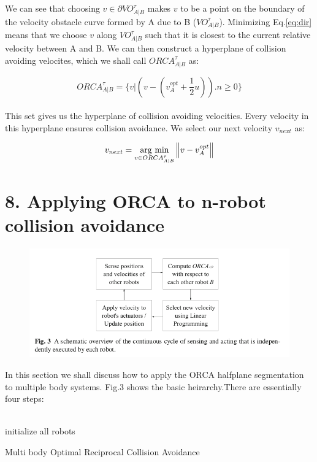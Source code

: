 \documentclass[12pt]{report}
\newcommand{\argmin}[1]{\underset{#1}{\operatorname{arg}\,\operatorname{min}}\;}
\begin{document}
We can see that choosing $v \in \partial VO^{\tau}_{A|B}$ makes $v$ to be a point on the boundary of the velocity obstacle curve formed by A due to B ($VO^{\tau}_{A|B}$). Minimizing Eq.\ref{eq:dir} means that we choose $v$ along $VO^{\tau}_{A|B}$ such that it is closest to the current relative velocity between A and B. We can then construct a hyperplane of collision avoiding velocites, which we shall call $ORCA^{\tau}_{A|B}$ as:

\begin{equation}
ORCA^{\tau}_{A|B} = \{v|(v-(v_{A}^{opt} + \frac{1}{2}u)).n \geq 0\}
\end{equation}\\


This set gives us the hyperplane of collision avoiding velocities. Every velocity in this hyperplane ensures collision avoidance. We select our next velocity $v_{next}$ as:

\begin{equation}
v_{next} = \argmin{v \in ORCA^{\tau}_{A|B}}{\norm {v-v_{A}^{opt}}}
\end{equation}




\chapter*{8.  Applying ORCA to n-robot collision avoidance}
\begin{figure}[h]
	\centering
	\includegraphics[scale=0.6]{n-body.png}  \label{fig:n-body}
\end{figure}
In this section we shall discuss how to apply the ORCA halfplane segmentation to multiple body systems. Fig.3 shows the basic heirarchy.There are essentially four steps:\\ \\
\begin{algorithm}[h]
\SetAlgoLined
 initialize all robots\;
 \caption{Multi body Optimal Reciprocal Collision Avoidance}\label{alg:ORCA}
\end{algorithm}
\end{document}
